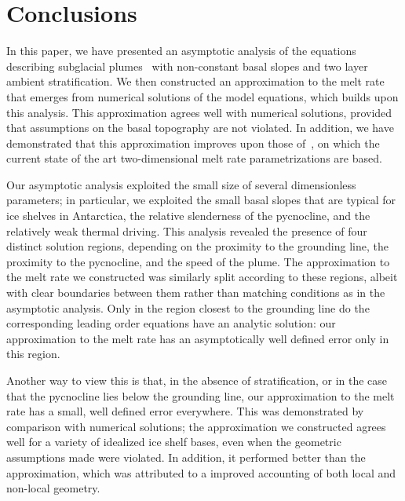 \documentclass[openacc]{rsproca_new}%
\begin{document}
\section{Conclusions}\label{S:Discussion}
In this paper, we have presented an asymptotic analysis of the equations describing subglacial plumes~\cite{Jenkins1991JGeophysResOceans, Jenkins2011JPhysOcean} with non-constant basal slopes and two layer ambient stratification. We then constructed an approximation to the melt rate that emerges from numerical solutions of the model equations, which builds upon this analysis. This approximation agrees well with numerical solutions, provided that assumptions on the basal topography are not violated. In addition, we have demonstrated that this approximation improves upon those of~\citet{Lazeroms2019JPhysOcean}, on which the current state of the art two-dimensional melt rate parametrizations are based.

Our asymptotic analysis exploited the small size of several dimensionless parameters; in particular, we exploited the small  basal slopes that are typical for ice shelves in Antarctica, the relative slenderness of the pycnocline, and the relatively weak thermal driving. This analysis revealed the presence of four distinct solution regions, depending on the proximity to the grounding line, the proximity to the pycnocline, and the speed of the plume. The approximation to the melt rate we constructed was similarly split according to these regions, albeit with clear boundaries between them rather than matching conditions as in the asymptotic analysis. Only in the region closest to the grounding line do the corresponding leading order equations have an analytic solution: our approximation to the melt rate has an asymptotically well defined error only in this region. 

Another way to view this is that, in the absence of stratification, or in the case that the pycnocline lies below the grounding line, our approximation to the melt rate has a small, well defined error everywhere.  This was demonstrated by comparison with numerical solutions; the approximation we constructed agrees well for a variety of idealized ice shelf bases, even when the geometric assumptions made were violated. In addition, it performed better than the ~\citet{Lazeroms2019JPhysOcean} approximation, which was attributed to a improved accounting of both local and non-local geometry.
\end{document}
